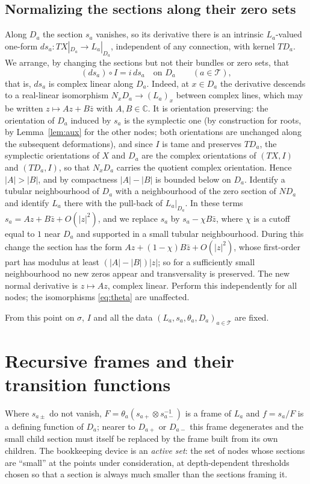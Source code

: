 \documentclass[12pt]{article}
\theoremstyle{remark}
\newcommand{\C}{\mathbb C}
\newcommand{\cT}{\mathcal T}
\begin{document}
\subsection*{Normalizing the sections along their zero sets}
Along $D_a$ the section $s_a$ vanishes, so its derivative there is an
intrinsic $L_a$-valued one-form $ds_a\colon TX|_{D_a}\to L_a|_{D_a}$,
independent of any connection, with kernel $TD_a$. We arrange, by
changing the sections but not their bundles or zero sets, that
\begin{equation}\label{eq:normal-linear}
 (ds_a)\circ I=i\,ds_a\quad\text{on }D_a\qquad(a\in\cT),
\end{equation}
that is, $ds_a$ is complex linear along $D_a$. Indeed, at $x\in D_a$
the derivative descends to a real-linear isomorphism
$N_xD_a\to(L_a)_x$ between complex lines, which may be written
$z\mapsto Az+B\bar z$ with $A,B\in\C$. It is orientation preserving:
the orientation of $D_a$ induced by $s_a$ is the symplectic one (by
construction for roots, by Lemma~\ref{lem:aux} for the other nodes;
both orientations are unchanged along the subsequent deformations),
and since $I$ is tame and preserves $TD_a$, the symplectic orientations
of $X$ and $D_a$ are the complex orientations of $(TX,I)$ and
$(TD_a,I)$, so that $N_xD_a$ carries the quotient complex orientation.
Hence $|A|>|B|$, and by compactness $|A|-|B|$ is bounded below on $D_a$. Identify a tubular neighbourhood of $D_a$ with a
neighbourhood of the zero section of $ND_a$ and identify $L_a$ there
with the pull-back of $L_a|_{D_a}$. In these terms $s_a=Az+B\bar z+O(|z|^2)$,
and we replace $s_a$ by $s_a-\chi B\bar z$, where $\chi$ is a cutoff
equal to $1$ near $D_a$ and supported in a small tubular neighbourhood.
During this change the section has the form
$Az+(1-\chi)B\bar z+O(|z|^2)$, whose first-order part has modulus at
least $(|A|-|B|)|z|$; so for a sufficiently small neighbourhood no new
zeros appear and transversality is preserved. The new normal derivative is $z\mapsto Az$, complex
linear. Perform this independently for all nodes; the isomorphisms
\eqref{eq:theta} are unaffected.

From this point on $\sigma$, $I$ and all the data
$(L_a,s_a,\theta_a,D_a)_{a\in\cT}$ are fixed.

\section{Recursive frames and their transition functions}\label{sec:frames}

Where $s_{a\pm}$ do not vanish, $F=\theta_a(s_{a+}\otimes s_{a-}^{-1})$
is a frame of $L_a$ and $f=s_a/F$ is a defining function of $D_a$;
nearer to $D_{a+}$ or $D_{a-}$ this frame degenerates and the small
child section must itself be replaced by the frame built from its own
children. The bookkeeping device is an \emph{active set}: the set of nodes
whose sections are ``small'' at the points under consideration, at
depth-dependent thresholds chosen so that a section is always much
smaller than the sections framing it.
\end{document}
